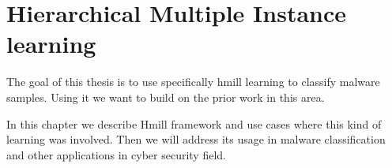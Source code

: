 \chapter{Hierarchical Multiple Instance learning}
The goal of this thesis is to use specifically hmill learning to classify malware samples. Using it we want to  build on the prior work in this area. 

In this chapter we describe Hmill framework and use cases where this kind of learning was involved. Then we will address its usage in malware classification and other applications in cyber security field.